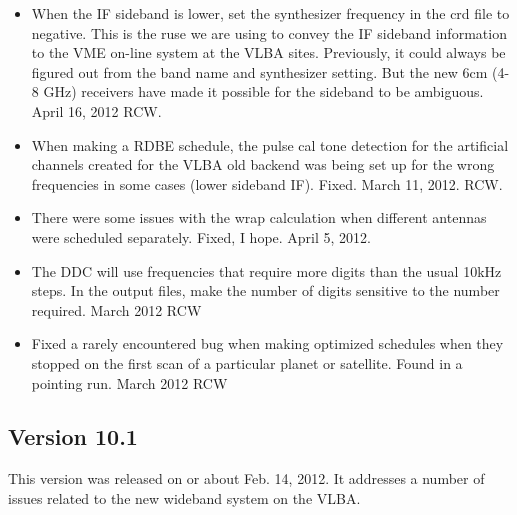 \documentclass{report}
\begin{document}
\begin{itemize}
\item When the IF sideband is lower, set the synthesizer frequency
in the crd file to negative.  This is the ruse we are using to convey
the IF sideband information to the VME on-line system at the VLBA
sites.  Previously, it could always be figured out from the band
name and synthesizer setting.  But the new 6cm (4-8 GHz) receivers
have made it possible for the sideband to be ambiguous.  April 16, 2012
RCW.

\item When making a RDBE schedule, the pulse cal tone detection for
the artificial channels created for the VLBA old backend was being 
set up for the wrong frequencies in some cases (lower sideband IF).
Fixed.  March 11, 2012.  RCW.

\item There were some issues with the wrap calculation when different
antennas were scheduled separately.  Fixed, I hope.  April 5, 2012.

\item The DDC will use frequencies that require more digits than the 
usual 10kHz steps.  In the output files, make the number of digits
sensitive to the number required.  March 2012 RCW

\item Fixed a rarely encountered bug when making optimized schedules when
they stopped on the first scan of a particular planet or satellite.
Found in a pointing run.  March 2012  RCW

\end{itemize}

\subsection{\label{SSEC:VER_10.1}Version 10.1}

This version was released on or about Feb. 14, 2012.  It addresses a number 
of issues related to the new wideband system on the VLBA.
\end{document}
